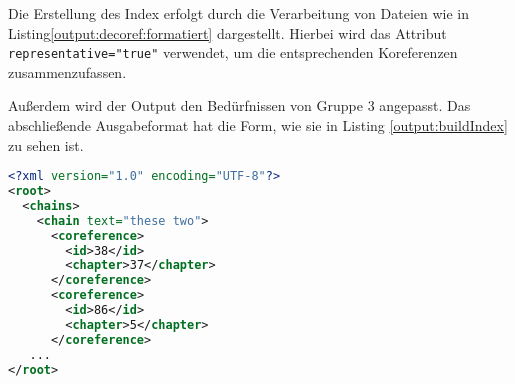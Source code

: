 Die Erstellung des Index erfolgt durch die Verarbeitung von Dateien wie in Listing\ref{output:decoref:formatiert} dargestellt.
Hierbei wird das Attribut \lstinline[language=XML]{representative="true"} verwendet, 
um die entsprechenden Koreferenzen zusammenzufassen.

Außerdem wird der Output den Bedürfnissen von Gruppe 3 angepasst.
Das abschließende Ausgabeformat hat die Form, wie sie in Listing \ref{output:buildIndex} zu sehen ist.

\begin{lstlisting}[label=output:buildIndex, name=index.xml, language=xml, caption={XML, Formatierte Ausgabe von \emph{BuildIndex}}]
<?xml version="1.0" encoding="UTF-8"?>
<root>
  <chains>
    <chain text="these two">
      <coreference>
        <id>38</id>
        <chapter>37</chapter>
      </coreference>
      <coreference>
        <id>86</id>
        <chapter>5</chapter>
      </coreference>
   ...
</root>
\end{lstlisting}

%   
%   
%   
%   
%   
%   
% 
%   
% 
%   
%   
%     
%     
%     
% 
% 
% 
% 
%   
%     
%   
